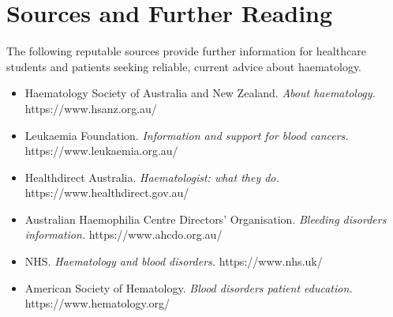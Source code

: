\section*{Sources and Further Reading}
The following reputable sources provide further information for healthcare students and patients seeking reliable, current advice about haematology.

\begin{itemize}
    \item Haematology Society of Australia and New Zealand. \textit{About haematology.} https://www.hsanz.org.au/
    \item Leukaemia Foundation. \textit{Information and support for blood cancers.} https://www.leukaemia.org.au/
    \item Healthdirect Australia. \textit{Haematologist: what they do.} https://www.healthdirect.gov.au/
    \item Australian Haemophilia Centre Directors' Organisation. \textit{Bleeding disorders information.} https://www.ahcdo.org.au/
    \item NHS. \textit{Haematology and blood disorders.} https://www.nhs.uk/
    \item American Society of Hematology. \textit{Blood disorders patient education.} https://www.hematology.org/
\end{itemize}

